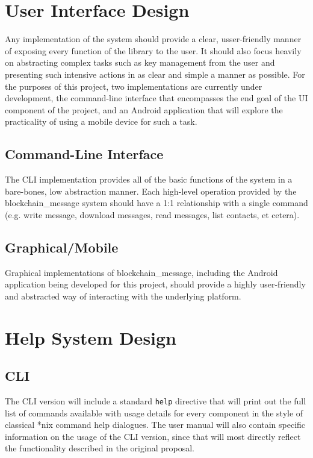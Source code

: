 \documentclass[titlepage]{report}
\begin{document}
\section{User Interface Design}
Any implementation of the system should provide a clear, usser-friendly manner of exposing every function of the library to the user. It should also focus heavily on abstracting complex tasks such as key management from the user and presenting such intensive actions in as clear and simple a manner as possible. For the purposes of this project, two implementations are currently under development, the command-line interface that encompasses the end goal of the UI component of the project, and an Android application that will explore the practicality of using a mobile device for such a task.

\subsection{Command-Line Interface}
The CLI implementation provides all of the basic functions of the system in a bare-bones, low abstraction manner. Each high-level operation provided by the blockchain\_message system should have a 1:1 relationship with a single command (e.g. write message, download messages, read messages, list contacts, et cetera).

\subsection{Graphical/Mobile}
Graphical implementations of blockchain\_message, including the Android application being developed for this project, should provide a highly user-friendly and abstracted way of interacting with the underlying platform.

\section{Help System Design}

\subsection{CLI}
The CLI version will include a standard \verb|help| directive that will print out the full list of commands available with usage details for every component in the style of classical *nix command help dialogues. The user manual will also contain specific information on the usage of the CLI version, since that will most directly reflect the functionality described in the original proposal.
\end{document}
